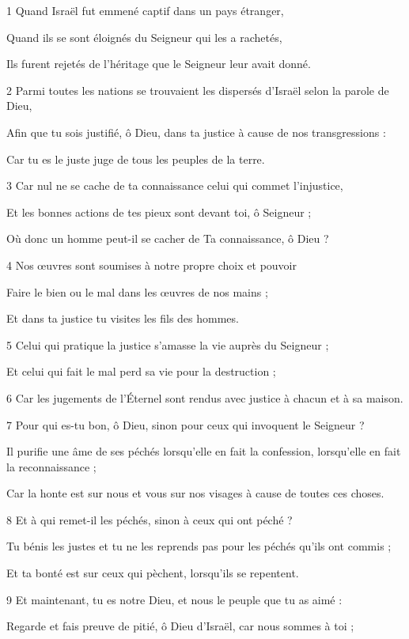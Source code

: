 \par 1 Quand Israël fut emmené captif dans un pays étranger,
\par     Quand ils se sont éloignés du Seigneur qui les a rachetés,
\par     Ils furent rejetés de l’héritage que le Seigneur leur avait donné.
\par 2 Parmi toutes les nations se trouvaient les dispersés d'Israël selon la parole de Dieu,
\par     Afin que tu sois justifié, ô Dieu, dans ta justice à cause de nos transgressions :
\par     Car tu es le juste juge de tous les peuples de la terre.
\par 3 Car nul ne se cache de ta connaissance celui qui commet l'injustice,
\par     Et les bonnes actions de tes pieux sont devant toi, ô Seigneur ;
\par     Où donc un homme peut-il se cacher de Ta connaissance, ô Dieu ?
\par 4 Nos œuvres sont soumises à notre propre choix et pouvoir
\par     Faire le bien ou le mal dans les œuvres de nos mains ;
\par     Et dans ta justice tu visites les fils des hommes.
\par 5 Celui qui pratique la justice s'amasse la vie auprès du Seigneur ;
\par     Et celui qui fait le mal perd sa vie pour la destruction ;
\par 6 Car les jugements de l'Éternel sont rendus avec justice à chacun et à sa maison.
\par 7 Pour qui es-tu bon, ô Dieu, sinon pour ceux qui invoquent le Seigneur ?
\par     Il purifie une âme de ses péchés lorsqu'elle en fait la confession, lorsqu'elle en fait la reconnaissance ;
\par     Car la honte est sur nous et vous sur nos visages à cause de toutes ces choses.
\par 8 Et à qui remet-il les péchés, sinon à ceux qui ont péché ?
\par     Tu bénis les justes et tu ne les reprends pas pour les péchés qu'ils ont commis ;
\par     Et ta bonté est sur ceux qui pèchent, lorsqu'ils se repentent.
\par 9 Et maintenant, tu es notre Dieu, et nous le peuple que tu as aimé :
\par     Regarde et fais preuve de pitié, ô Dieu d'Israël, car nous sommes à toi ;

